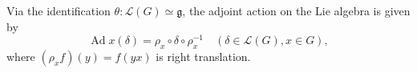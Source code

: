 Via the identification $\theta: \mathcal{L}(G) \simeq \mathfrak{g}$, the adjoint action on the Lie algebra is given by
$$\operatorname{Ad} x(\delta) = \rho_x \circ \delta \circ \rho_x^{-1} \quad (\delta \in \mathcal{L}(G), x \in G),$$
where $(\rho_x f)(y) = f(yx)$ is right translation.

